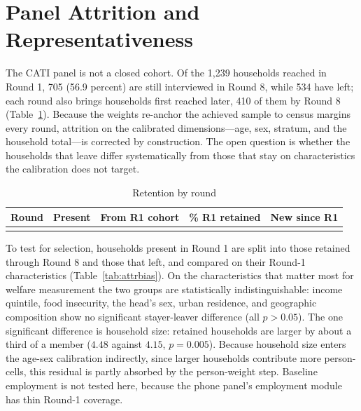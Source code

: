 \documentclass[AEJ]{AEA}
\begin{document}
\section{Panel Attrition and Representativeness}

The CATI panel is not a closed cohort. Of the 1{,}239 households reached in Round
1, 705 (56.9 percent) are still interviewed in Round 8, while 534 have left; each
round also brings households first reached later, 410 of them by Round 8
(Table~\ref{tab:retention}). Because the weights re-anchor the achieved sample to
census margins every round, attrition on the calibrated dimensions---age, sex,
stratum, and the household total---is corrected by construction. The open question
is whether the households that leave differ systematically from those that stay on
characteristics the calibration does not target.

\begin{table}[!t]
\raggedright
\begin{threeparttable}
\caption{Retention by round}
\label{tab:retention}
\footnotesize
\begin{tabular}{@{}c r r r r@{}}
\toprule
Round & Present & From R1 cohort & \% R1 retained & New since R1 \\
\midrule
\\
\bottomrule
\end{tabular}
\end{threeparttable}
\end{table}

To test for selection, households present in Round 1 are split into those retained
through Round 8 and those that left, and compared on their Round-1 characteristics
(Table~\ref{tab:attrbias}). On the characteristics that matter most for welfare
measurement the two groups are statistically indistinguishable: income quintile,
food insecurity, the head's sex, urban residence, and geographic composition show
no significant stayer-leaver difference (all $p>0.05$). The one significant
difference is household size: retained households are larger by about a third of a
member ($4.48$ against $4.15$, $p=0.005$). Because household size enters the
age-sex calibration indirectly, since larger households contribute more
person-cells, this residual is partly absorbed by the person-weight step. Baseline
employment is not tested here, because the phone panel's employment module has
thin Round-1 coverage.
\end{document}
